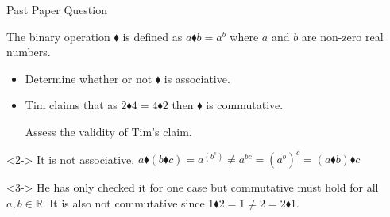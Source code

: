 \documentclass[8pt]{beamer}
\newcommand{\R}{\mathbb{R}}
\begin{document}
\begin{frame}{Past Paper Question}
	\begin{problem}
		The binary operation $\blacklozenge$ is defined as  $a\blacklozenge b= a^{b}$ where $a$ and  $ b$ are non-zero real numbers.
		 \begin{itemize}
			\item Determine whether or not $\blacklozenge$ is associative.
\item Tim claims that as $2\blacklozenge 4= 4 \blacklozenge 2 $ then $\blacklozenge$ is commutative.

	Assess the validity of Tim's claim.
		\end{itemize}
	\end{problem}

	\begin{solution}<2->
		It is not associative. $a\blacklozenge (b\blacklozenge c) = a^{(b^{c})} \neq a^{bc} = (a^{b})^{c}=(a\blacklozenge b)\blacklozenge c$
	\end{solution}

	\begin{solution}<3->
		He has only checked it for one case but commutative must hold for all $a,b\in \R$. It is also not commutative since $1\blacklozenge 2 = 1 \neq 2 = 2 \blacklozenge 1.$
	\end{solution}
\end{frame}
\end{document}
